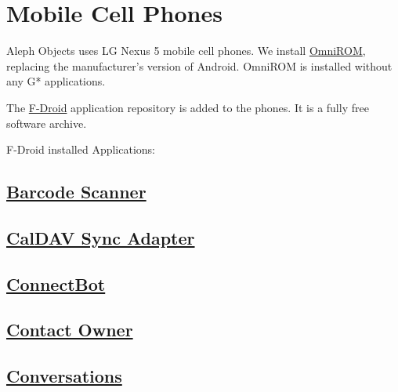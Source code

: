 %
%
%
%
%

\section{Mobile Cell Phones}
Aleph Objects uses LG Nexus 5 mobile cell phones. We install
\href{http://omnirom.org/}{OmniROM}, replacing the manufacturer's version
of Android. OmniROM is installed without any G* applications.

The \href{https://f-droid.org/}{F-Droid} application repository is added to
the phones. It is a fully free software archive.

F-Droid installed Applications:

\subsection{\href{https://f-droid.org/repository/browse/?fdfilter=barcode&fdid=com.google.zxing.client.android}{Barcode Scanner}}

\subsection{\href{https://f-droid.org/repository/browse/?fdcategory=Office&fdid=org.gege.caldavsyncadapter&fdpage=3}
{CalDAV Sync Adapter}}

\subsection{\href{https://f-droid.org/repository/browse/?fdcategory=Internet&fdid=org.connectbot}
{ConnectBot}}

\subsection{\href{https://f-droid.org/repository/browse/?fdcategory=System&fdid=com.appengine.paranoid_android.lost&fdpage=3}
{Contact Owner}}

\subsection{\href{https://f-droid.org/repository/browse/?fdcategory=Internet&fdid=eu.siacs.conversations}
{Conversations}}

